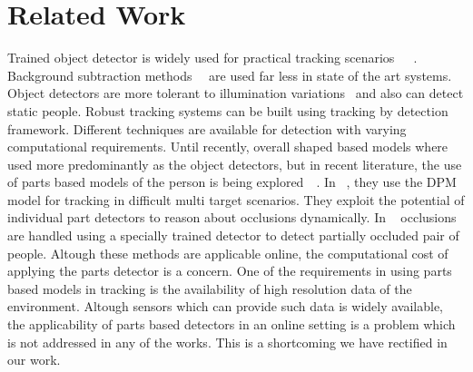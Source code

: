 \documentclass[10pt,twocolumn,letterpaper]{article}
\begin{document}
\section {Related Work} 
Trained object detector is widely used for practical tracking scenarios~\cite{Pami-11}~\cite{POM-main}~\cite{MIL-obj1}. Background subtraction methods~\cite{bk1}~\cite{bk2-bayesian} are used far less in state of the art systems. Object detectors are more tolerant to illumination variations~\cite{ObjDet-1} and also can detect static people. Robust tracking systems can be built using tracking by detection framework.
Different techniques are available for detection with varying computational requirements. Until recently, overall shaped based models where used more predominantly as the object detectors, but in recent literature, the use of parts based models of the person is being explored~\cite{doubleperson}~\cite{Parts_tracking1}.
In ~\cite{Parts_tracking1}, they use the DPM model for tracking in difficult multi target scenarios. They exploit the potential of individual part detectors to reason about occlusions dynamically. In ~\cite{doubleperson} occlusions are handled using a specially trained detector to detect partially occluded pair of people.
Altough these methods are applicable online, the computational cost of applying the parts detector is a concern. One of the requirements in using parts based models in tracking is the availability of high resolution data of the environment. Altough sensors which can provide such data is widely available, the applicability of parts based detectors in an online setting is a problem which is not addressed in any of the works. This is a shortcoming we have rectified in our work.
\end{document}
